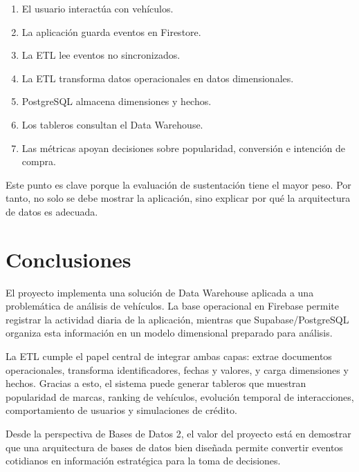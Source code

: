 \documentclass[12pt,letterpaper]{article}
\begin{document}
\begin{enumerate}
    \item El usuario interactúa con vehículos.
    \item La aplicación guarda eventos en Firestore.
    \item La ETL lee eventos no sincronizados.
    \item La ETL transforma datos operacionales en datos dimensionales.
    \item PostgreSQL almacena dimensiones y hechos.
    \item Los tableros consultan el Data Warehouse.
    \item Las métricas apoyan decisiones sobre popularidad, conversión e intención de compra.
\end{enumerate}

Este punto es clave porque la evaluación de sustentación tiene el mayor peso. Por tanto, no solo se debe mostrar la aplicación, sino explicar por qué la arquitectura de datos es adecuada.

\section{Conclusiones}

El proyecto implementa una solución de Data Warehouse aplicada a una problemática de análisis de vehículos. La base operacional en Firebase permite registrar la actividad diaria de la aplicación, mientras que Supabase/PostgreSQL organiza esta información en un modelo dimensional preparado para análisis.

La ETL cumple el papel central de integrar ambas capas: extrae documentos operacionales, transforma identificadores, fechas y valores, y carga dimensiones y hechos. Gracias a esto, el sistema puede generar tableros que muestran popularidad de marcas, ranking de vehículos, evolución temporal de interacciones, comportamiento de usuarios y simulaciones de crédito.

Desde la perspectiva de Bases de Datos 2, el valor del proyecto está en demostrar que una arquitectura de bases de datos bien diseñada permite convertir eventos cotidianos en información estratégica para la toma de decisiones.
\end{document}
